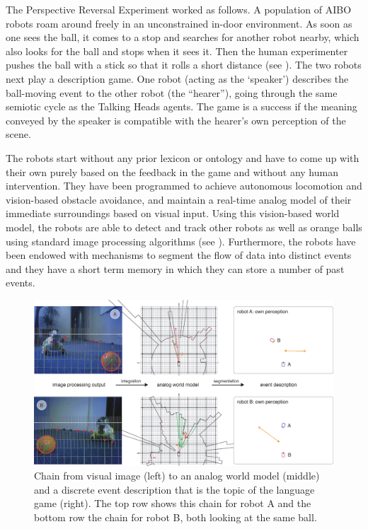 The Perspective Reversal Experiment worked as follows. A population of AIBO robots roam around
freely in an unconstrained in-door environment. As soon as one sees the
ball, it comes to a stop and searches for another robot nearby, which also
looks for the ball and stops when it sees it. Then the human
experimenter pushes the ball with a stick so that it rolls a short
distance (see ). The two robots next play a description game. One robot (acting as the `speaker') 
describes the ball-moving event to the other robot (the ``hearer''), going through the same semiotic cycle as the Talking 
Heads agents. The game is a success if the meaning conveyed by the speaker is compatible with the hearer's 
own perception of the scene. 

The robots start without any prior lexicon or ontology and have to come up with their own 
purely based on the feedback in the game and without any human intervention. 
They have been programmed to achieve autonomous locomotion and vision-based obstacle avoidance,
and maintain a real-time analog model of their immediate surroundings based on visual input. Using
this vision-based world model, the robots are able to detect and track
other robots as well as orange balls using standard image processing
algorithms (see ). Furthermore, the
robots have been endowed with mechanisms to segment the flow of data
into distinct events and they have a short term memory in which they
can store a number of past events.

\begin{figure}[htbp]
  \centerline{\includegraphics[width=.90\textwidth]{chap10/figs/persp-rev-perception.pdf}}
\caption{\label{fig:persp-rev-perception} 
Chain from visual image (left) to an analog world model (middle) and a discrete event description
that is the topic of the language game (right). 
The top row shows this chain for robot A and the bottom row the chain for robot B, both looking at the same ball.}
\end{figure}

